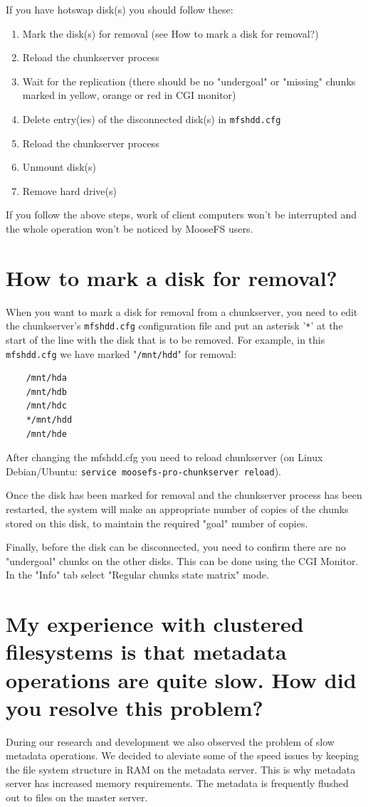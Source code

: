 \documentclass[a4paper,11pt,english]{report}
\def\code#1{\texttt{#1}}
\begin{document}
		\bigskip
		If you have hotswap disk(s) you should follow these: 
		\begin{enumerate}
			\item Mark the disk(s) for removal (see How to mark a disk for removal?)
			\item Reload the chunkserver process
			\item Wait for the replication (there should be no "undergoal" or "missing" chunks marked in yellow, orange or red in CGI monitor)
			\item Delete entry(ies) of the disconnected disk(s) in \code{mfshdd.cfg}
			\item Reload the chunkserver process
			\item Unmount disk(s)
			\item Remove hard drive(s)
		\end{enumerate}		
		If you follow the above steps, work of client computers won't be interrupted and the whole operation won't be noticed by MooseFS users.
		
		
		\section{How to mark a disk for removal?}
		When you want to mark a disk for removal from a chunkserver, you need to edit the chunkserver's \code{mfshdd.cfg} configuration file and put an asterisk '\code{*}' at the start of the line with the disk that is to be removed. For example, in this \code{mfshdd.cfg} we have marked "\code{/mnt/hdd}" for removal:
		\begin{lstlisting}
	/mnt/hda
	/mnt/hdb
	/mnt/hdc
	*/mnt/hdd
	/mnt/hde 
		\end{lstlisting}
		
		After changing the mfshdd.cfg you need to reload chunkserver (on Linux Debian/Ubuntu: \code{service moosefs-pro-chunkserver reload}). 
		
		Once the disk has been marked for removal and the chunkserver process has been restarted, the system will make an appropriate number of copies of the chunks stored on this disk, to maintain the required "goal" number of copies.
		
		Finally, before the disk can be disconnected, you need to confirm there are no "undergoal" chunks on the other disks. This can be done using the CGI Monitor. In the "Info" tab select "Regular chunks state matrix" mode.
		
		
		\section{My experience with clustered filesystems is that metadata operations are quite slow. How did you resolve this problem?}
		During our research and development we also observed the problem of slow metadata operations. We decided to aleviate some of the speed issues by keeping the file system structure in RAM on the metadata server. This is why metadata server has increased memory requirements. The metadata is frequently flushed out to files on the master server.
		
\end{document}
